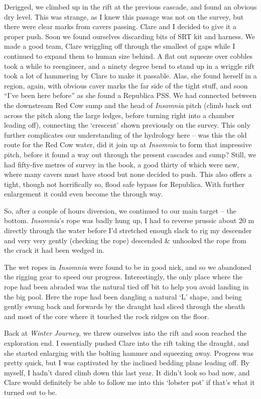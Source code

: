 Derigged, we climbed up in the rift at the previous cascade, and found
an obvious dry level. This was strange, as I knew this passage was not
on the survey, but there were clear marks from cavers passing. Clare and
I decided to give it a proper push. Soon we found ourselves discarding
bits of SRT kit and harness. We made a good team, Clare wriggling off
through the smallest of gaps while I continued to expand them to human
size behind. A flat out squeeze over cobbles took a while to reengineer,
and a ninety degree bend to stand up in a wriggle rift took a lot of
hammering by Clare to make it passable. Alas, she found herself in a
region, again, with obvious caver marks the far side of the tight stuff,
and soon ``I've been here before'' as she found a Republica PSS. We had
connected between the downstream Red Cow sump and the head of
\emph{Insomnia} pitch (climb back out across the pitch along the large
ledges, before turning right into a chamber leading off), connecting the
`crescent' shown previously on the survey. This only further complicates
our understanding of the hydrology here -- was this the old route for
the Red Cow water, did it join up at \emph{Insomnia} to form that
impressive pitch, before it found a way out through the present cascades
and sump? Still, we had fifty-five metres of survey in the book, a good
thirty of which were new, where many cavers must have stood but none
decided to push. This also offers a tight, though not horrifically so,
flood safe bypass for Republica. With further enlargement it could even
become the through way.

So, after a couple of hours diversion, we continued to our main target
-- the bottom. \emph{Insomnia}'s rope was badly hung up, I had to
reverse prussic about 20 m directly through the water before I'd
stretched enough slack to rig my descender and very very gently
(checking the rope) descended \& unhooked the rope from the crack it had
been wedged in.

The wet ropes in \emph{Insomnia} were found to be in good nick, and so
we abandoned the rigging gear to speed our progress. Interestingly, the
only place where the rope had been abraded was the natural tied off bit
to help you avoid landing in the big pool. Here the rope had been
dangling a natural `L' shape, and being gently swung back and forwards
by the draught had sliced through the sheath and most of the core where
it touched the rock ridges on the floor.

Back at \emph{Winter Journey}, we threw ourselves into the rift and soon
reached the exploration end. I essentially pushed Clare into the rift
taking the draught, and she started enlarging with the bolting hammer
and squeezing away. Progress was pretty quick, but I was captivated by
the inclined bedding plane leading off. By myself, I hadn't dared climb
down this last year. It didn't look so bad now, and Clare would
definitely be able to follow me into this `lobster pot' if that's what
it turned out to be.

